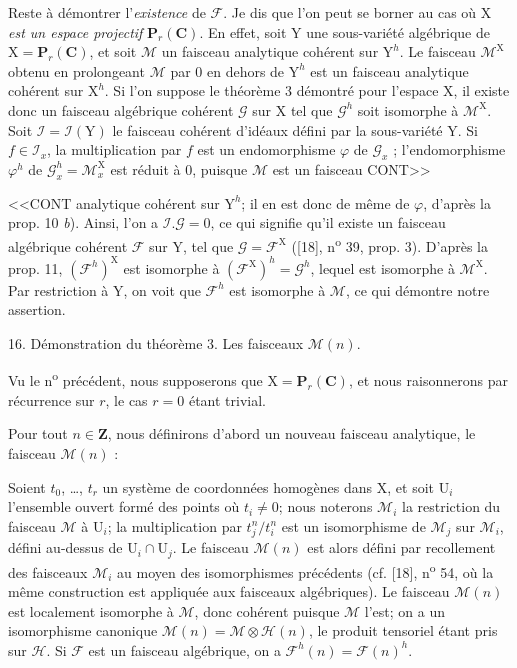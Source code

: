 Reste à démontrer l'\textit{existence} de $\mathcal{F}$. Je dis que l'on peut se borner au cas où $\mathrm{X}$ \textit{est un espace projectif} $\mathbf{P}_r(\mathbf{C})$. En effet, soit $\mathrm{Y}$ une sous-variété algébrique de $\mathrm{X} = \mathbf{P}_r(\mathbf{C})$, et soit $\mathcal{M}$ un faisceau analytique cohérent sur $\mathrm{Y}^h$. Le faisceau $\mathcal{M}^{\mathrm{X}}$ obtenu en prolongeant $\mathcal{M}$ par 0 en dehors de $\mathrm{Y}^h$ est un faisceau analytique cohérent sur $\mathrm{X}^h$. Si l'on suppose le théorème 3 démontré pour l'espace $\mathrm{X}$, il existe donc un faisceau algébrique cohérent $\mathcal{G}$ sur $\mathrm{X}$ tel que $\mathcal{G}^h$ soit isomorphe à $\mathcal{M}^{\mathrm{X}}$. Soit $\mathcal{I} = \mathcal{I}(\mathrm{Y})$ le faisceau cohérent d'idéaux défini par la sous-variété $\mathrm{Y}$. Si $f \in \mathcal{I}_x$, la multiplication par $f$ est un endomorphisme $\varphi$ de $\mathcal{G}_x$ ; l'endomorphisme $\varphi^h$ de $\mathcal{G}^h_x = \mathcal{M}^{\mathrm{X}}_x$ est réduit à 0, puisque $\mathcal{M}$ est un faisceau CONT>>



<<CONT analytique cohérent sur $\mathrm{Y}^h$; il en est donc de même de $\varphi$, d'après la prop. 10 \textit{b}). Ainsi, l'on a $\mathcal{I}.\mathcal{G} = 0$, ce qui signifie qu'il existe un faisceau algébrique cohérent $\mathcal{F}$ sur $\mathrm{Y}$, tel que $\mathcal{G} = \mathcal{F}^{\mathrm{X}}$ ([18], n\textsuperscript{o} 39, prop. 3). D'après la prop. 11, $(\mathcal{F}^h)^{\mathrm{X}}$ est isomorphe à $(\mathcal{F}^{\mathrm{X}})^h = \mathcal{G}^h$, lequel est isomorphe à $\mathcal{M}^{\mathrm{X}}$. Par restriction à $\mathrm{Y}$, on voit que $\mathcal{F}^h$ est isomorphe à $\mathcal{M}$, ce qui démontre notre assertion.


16. Démonstration du théorème 3. Les faisceaux $\mathcal{M}(n)$.

Vu le n\textsuperscript{o} précédent, nous supposerons que $\mathrm{X} = \mathbf{P}_r(\mathbf{C})$, et nous raisonnerons par récurrence sur $r$, le cas $r = 0$ étant trivial.

Pour tout $n \in \mathbf{Z}$, nous définirons d'abord un nouveau faisceau analytique, le faisceau $\mathcal{M}(n)$ :

Soient $t_0$, \ldots, $t_r$ un système de coordonnées homogènes dans $\mathrm{X}$, et soit $\mathrm{U}_i$ l'ensemble ouvert formé des points où $t_i \neq 0$; nous noterons $\mathcal{M}_i$ la restriction du faisceau $\mathcal{M}$ à $\mathrm{U}_i$; la multiplication par $t_j^n/t_i^n$ est un isomorphisme de $\mathcal{M}_j$ sur $\mathcal{M}_i$, défini au-dessus de $\mathrm{U}_i \cap \mathrm{U}_j$. Le faisceau $\mathcal{M}(n)$ est alors défini par recollement des faisceaux $\mathcal{M}_i$ au moyen des isomorphismes précédents (cf. [18], n\textsuperscript{o} 54, où la même construction est appliquée aux faisceaux algébriques). Le faisceau $\mathcal{M}(n)$ est localement isomorphe à $\mathcal{M}$, donc cohérent puisque $\mathcal{M}$ l'est; on a un isomorphisme canonique $\mathcal{M}(n) = \mathcal{M} \otimes \mathcal{H}(n)$, le produit tensoriel étant pris sur $\mathcal{H}$. Si $\mathcal{F}$ est un faisceau algébrique, on a $\mathcal{F}^h(n) = \mathcal{F}(n)^h$.

